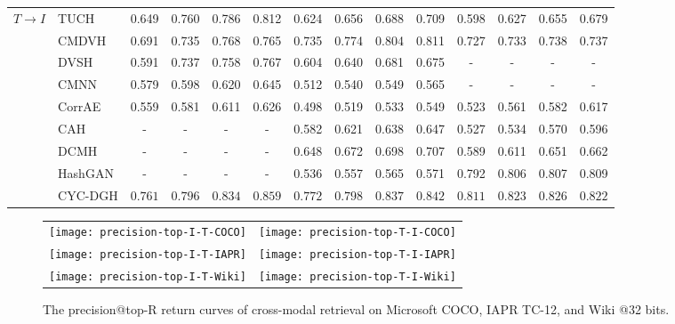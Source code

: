\documentclass[10pt,journal,twocolumn]{IEEEtran}
\begin{document}
\begin{table*}[hbt]
{\begin{tabular}{l|l|c|c|c|c|c|c|c|c|c|c|c|c}
  \hline
   \multirow{9}{*}{$T \rightarrow I$} & TUCH \cite{TUCH} & 0.649 & 0.760 & 0.786 & 0.812 & 0.624 & 0.656 & 0.688 & 0.709 & 0.598 & 0.627 & 0.655 & 0.679\\
   & CMDVH \cite{CMDVH} & 0.691 & 0.735 & 0.768 & 0.765 & 0.735 & 0.774 & 0.804 & 0.811 & 0.727 & 0.733 & 0.738 & 0.737\\
   & DVSH \cite{DVSH} & 0.591 & 0.737 & 0.758 & 0.767 & 0.604 & 0.640 & 0.681 & 0.675 & - & - & - & - \\
   & CMNN \cite{Multimodal-hashing} & 0.579 & 0.598 & 0.620 & 0.645 & 0.512 & 0.540 & 0.549 & 0.565 & - & - & - & - \\
   & CorrAE \cite{Corr-AE} & 0.559 & 0.581 & 0.611 & 0.626 & 0.498 & 0.519 & 0.533 & 0.549 & 0.523 & 0.561 & 0.582 & 0.617 \\
   & CAH \cite{CAH} & - & - & - & - & 0.582 & 0.621 & 0.638 & 0.647 & 0.527 & 0.534 & 0.570 & 0.596 \\
   & DCMH \cite{DCMH} & - & - & - & - & 0.648 & 0.672 & 0.698 & 0.707 & 0.589 & 0.611 & 0.651 & 0.662 \\
   & HashGAN \cite{HashGAN} & - & - & - & - & 0.536 & 0.557 & 0.565 & 0.571 & 0.792 & 0.806 & 0.807 & 0.809 \\
   & CYC-DGH & \color{red}$\mathbf{0.761}$ & \color{red}$\mathbf{0.796}$ & \color{red}$\mathbf{0.834}$ & \color{red}$\mathbf{0.859}$ & \color{red}$\mathbf{0.772}$ & \color{red}$\mathbf{0.798}$ & \color{red}$\mathbf{0.837}$ & \color{red}$\mathbf{0.842}$ & \color{red}$\mathbf{0.811}$ & \color{red}$\mathbf{0.823}$ & \color{red}$\mathbf{0.826}$ & \color{red}$\mathbf{0.822}$ \\
  \hline
  \end{tabular}
  }
\end{table*}


\begin{figure}[t]
\begin{tabular}{cc}
\texttt{[image: precision-top-I-T-COCO]}&
\texttt{[image: precision-top-T-I-COCO]}\\
\texttt{[image: precision-top-I-T-IAPR]}&
\texttt{[image: precision-top-T-I-IAPR]}\\
\texttt{[image: precision-top-I-T-Wiki]}&
\texttt{[image: precision-top-T-I-Wiki]}\\
\end{tabular}
\caption{The precision@top-R return curves of cross-modal retrieval on Microsoft COCO, IAPR TC-12, and Wiki @32 bits.}
\label{fig:precision-top-return}
\end{figure}
\end{document}
